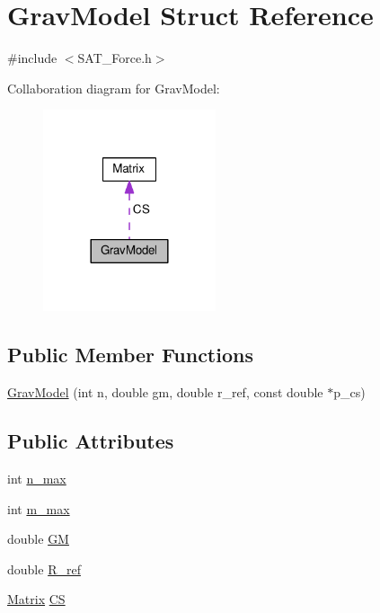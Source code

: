 \hypertarget{structGravModel}{\section{Grav\-Model Struct Reference}
\label{structGravModel}
}


{\ttfamily \#include $<$S\-A\-T\-\_\-\-Force.\-h$>$}



Collaboration diagram for Grav\-Model\-:\nopagebreak
\begin{figure}[H]
\begin{center}
\leavevmode
\includegraphics[width=144pt]{structGravModel__coll__graph}
\end{center}
\end{figure}
\subsection*{Public Member Functions}
\begin{DoxyCompactItemize}
\item 
\hyperlink{structGravModel_a0497787562c367ca5f322d23885df1c1}{Grav\-Model} (int n, double gm, double r\-\_\-ref, const double $\ast$p\-\_\-cs)
\end{DoxyCompactItemize}
\subsection*{Public Attributes}
\begin{DoxyCompactItemize}
\item 
int \hyperlink{structGravModel_a2523255eb438cc2d4d7166d01abbb805}{n\-\_\-max}
\item 
int \hyperlink{structGravModel_a77ed9c234c938a6ebb239df2174df476}{m\-\_\-max}
\item 
double \hyperlink{structGravModel_a138296eb0d0cdfd86615872e09db9382}{G\-M}
\item 
double \hyperlink{structGravModel_ad1690c2e76a4b250fa68a42ebc495cec}{R\-\_\-ref}
\item 
\hyperlink{classMatrix}{Matrix} \hyperlink{structGravModel_a6c399c91b140cef19ed5ebfc9117cffb}{C\-S}
\end{DoxyCompactItemize}


